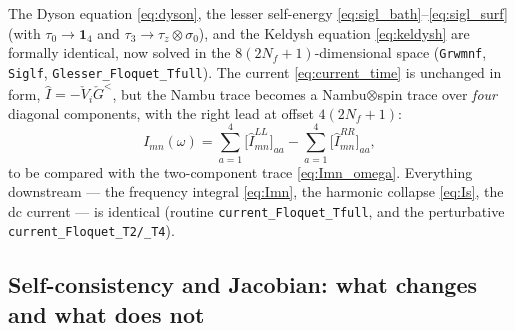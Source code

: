 \documentclass[11pt,a4paper]{article}
\newcommand{\id}{\mathbf{1}}          %
\newcommand{\tauz}{\tau_3}
\begin{document}
The Dyson equation \eqref{eq:dyson}, the lesser self-energy
\eqref{eq:sigl_bath}--\eqref{eq:sigl_surf} (with $\tau_0\!\to\!\id_4$ and
$\tauz\!\to\!\tau_z\otimes\sigma_0$), and the Keldysh equation \eqref{eq:keldysh}
are formally identical, now solved in the $8(2N_f+1)$-dimensional space
(\texttt{Grwmnf}, \texttt{Siglf}, \texttt{Glesser\_Floquet\_Tfull}).  The current
\eqref{eq:current_time} is unchanged in form, $\hat I=-\check V_i\check G^<$, but
the Nambu trace becomes a Nambu$\otimes$spin trace over \emph{four} diagonal
components, with the right lead at offset $4(2N_f+1)$:
\begin{equation}
  I_{mn}(\omega)
  = \sum_{a=1}^{4}\big[\hat I^{LL}_{mn}\big]_{aa}
  - \sum_{a=1}^{4}\big[\hat I^{RR}_{mn}\big]_{aa},
  \label{eq:Imn_4x4}
\end{equation}
to be compared with the two-component trace \eqref{eq:Imn_omega}.  Everything
downstream --- the frequency integral \eqref{eq:Imn}, the harmonic collapse
\eqref{eq:Is}, the dc current --- is identical (routine
\texttt{current\_Floquet\_Tfull}, and the perturbative
\texttt{current\_Floquet\_T2/\_T4}).

\subsection{Self-consistency and Jacobian: what changes and what does not}
\label{sec:ysr_jac}
\end{document}
